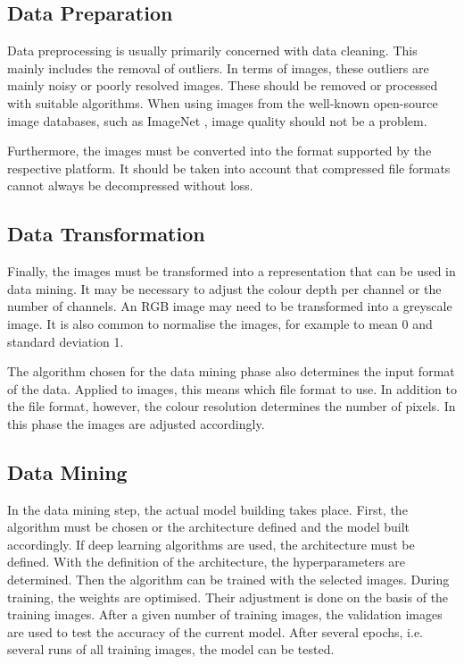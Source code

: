 \subsection{Data Preparation}

Data preprocessing is usually primarily concerned with data cleaning. This mainly includes the removal of outliers. In terms of images, these outliers are mainly noisy or poorly resolved images. These should be removed or processed with suitable algorithms. When using images from the well-known open-source image databases, such as ImageNet \cite{Deng:2009}, image quality should not be a problem.

Furthermore, the images must be converted into the format supported by the respective platform. It should be taken into account that compressed file formats cannot always be decompressed without loss.

\subsection{Data Transformation}

Finally, the images must be transformed into a representation that can be used in data mining. It may be necessary to adjust the colour depth per channel or the number of channels. An RGB image may need to be transformed into a greyscale image. It is also common to normalise the images, for example to mean 0 and standard deviation 1.

The algorithm chosen for the data mining phase also determines the input format of the data. Applied to images, this means which file format to use. In addition to the file format, however, the colour resolution determines the number of pixels. In this phase the images are adjusted accordingly.


\subsection{Data Mining}

In the data mining step, the actual model building takes place. First, the algorithm must be chosen or the architecture defined and the model built accordingly. If deep learning algorithms are used, the architecture must be defined. With the definition of the architecture, the hyperparameters are determined.  Then the algorithm can be trained with the selected images. During training, the weights are optimised. Their adjustment is done on the basis of the training images. After a given number of training images, the validation images are used to test the accuracy of the current model. After several epochs, i.e. several runs of all training images, the model can be tested.

